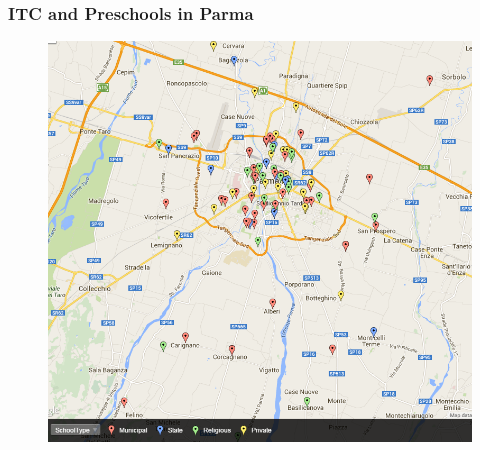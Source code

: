 \documentclass[xcolor=table]{beamer}
\begin{document}
\begin{frame}
\frametitle{ITC and Preschools in Parma}
\begin{center}
\begin{figure}
\includegraphics[height=0.9\textheight]{ParmaSchools.png}
\label{fig:ParmaSchools} 
\hyperlink{frame:treatment}{}
\end{figure}
\end{center}
\end{frame} 
\end{document}

